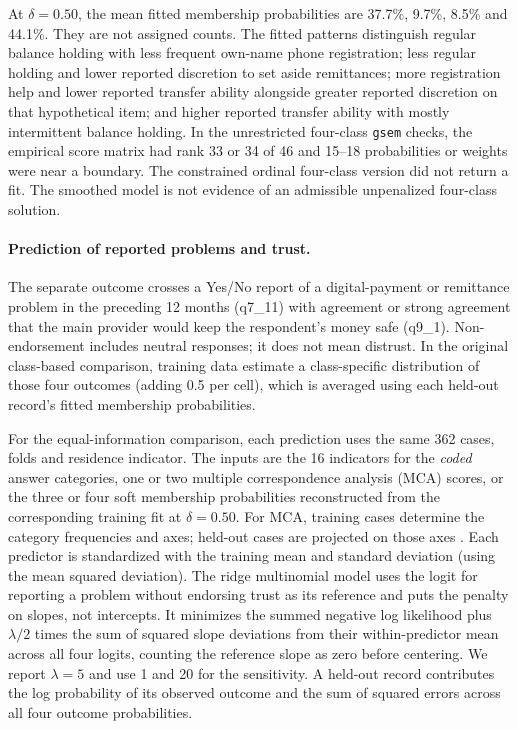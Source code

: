 At $\delta=0.50$, the mean fitted membership probabilities are 37.7\%, 9.7\%, 8.5\% and 44.1\%. They are not assigned counts. The fitted patterns distinguish regular balance holding with less frequent own-name phone registration; less regular holding and lower reported discretion to set aside remittances; more registration help and lower reported transfer ability alongside greater reported discretion on that hypothetical item; and higher reported transfer ability with mostly intermittent balance holding. In the unrestricted four-class \texttt{gsem} checks, the empirical score matrix had rank 33 or 34 of 46 and 15--18 probabilities or weights were near a boundary. The constrained ordinal four-class version did not return a fit. The smoothed model is not evidence of an admissible unpenalized four-class solution.

\paragraph{Prediction of reported problems and trust.}
The separate outcome crosses a Yes/No report of a digital-payment or remittance problem in the preceding 12 months (q7\_11) with agreement or strong agreement that the main provider would keep the respondent's money safe (q9\_1). Non-endorsement includes neutral responses; it does not mean distrust. In the original class-based comparison, training data estimate a class-specific distribution of those four outcomes (adding 0.5 per cell), which is averaged using each held-out record's fitted membership probabilities.

For the equal-information comparison, each prediction uses the same 362 cases, folds and residence indicator. The inputs are the 16 indicators for the \emph{coded} answer categories, one or two multiple correspondence analysis (MCA) scores, or the three or four soft membership probabilities reconstructed from the corresponding training fit at $\delta=0.50$. For MCA, training cases determine the category frequencies and axes; held-out cases are projected on those axes \citep{stata19mca}. Each predictor is standardized with the training mean and standard deviation (using the mean squared deviation). The ridge multinomial model uses the logit for reporting a problem without endorsing trust as its reference and puts the penalty on slopes, not intercepts. It minimizes the summed negative log likelihood plus $\lambda/2$ times the sum of squared slope deviations from their within-predictor mean across all four logits, counting the reference slope as zero before centering. We report $\lambda=5$ and use 1 and 20 for the sensitivity. A held-out record contributes the log probability of its observed outcome and the sum of squared errors across all four outcome probabilities.

